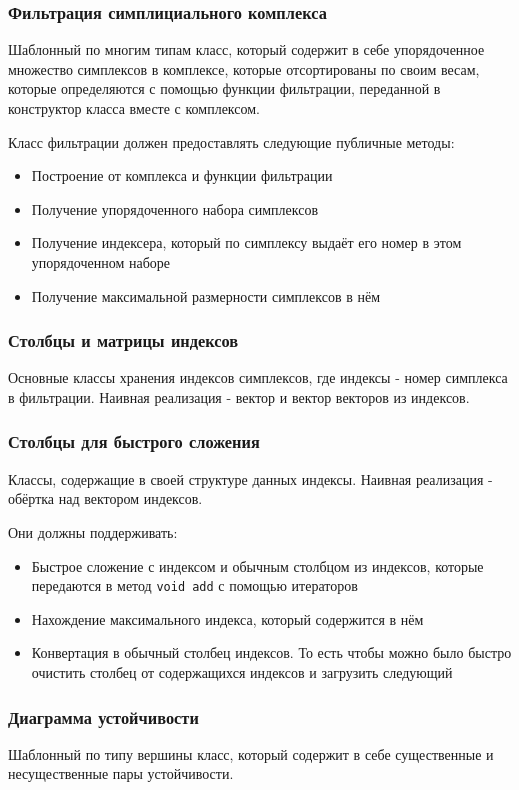 \documentclass{article}
\begin{document}
\subsubsection{Фильтрация симплициального комплекса}
Шаблонный по многим типам класс, который содержит в себе упорядоченное множество симплексов в комплексе, которые отсортированы по своим весам, которые определяются с помощью функции фильтрации, переданной в конструктор класса вместе с комплексом.

Класс фильтрации должен предоставлять следующие публичные методы:
\begin{itemize}
  \item Построение от комплекса и функции фильтрации
  \item Получение упорядоченного набора симплексов
  \item Получение индексера, который по симплексу выдаёт его номер в этом упорядоченном наборе
  \item Получение максимальной размерности симплексов в нём
\end{itemize}
\subsubsection{Столбцы и матрицы индексов}
Основные классы хранения индексов симплексов, где индексы - номер симплекса в фильтрации. Наивная реализация - вектор и вектор векторов из индексов.
\subsubsection{Столбцы для быстрого сложения}
Классы, содержащие в своей структуре данных индексы. Наивная реализация - обёртка над вектором индексов.

Они должны поддерживать:
\begin{itemize}
  \item Быстрое сложение с индексом и обычным столбцом из индексов, которые передаются в метод \verb"void add" с помощью итераторов
  \item Нахождение максимального индекса, который содержится в нём
  \item Конвертация в обычный столбец индексов. То есть чтобы можно было быстро очистить столбец от содержащихся индексов и загрузить следующий
\end{itemize}
\subsubsection{Диаграмма устойчивости}
Шаблонный по типу вершины класс, который содержит в себе существенные и несущественные пары устойчивости.
\end{document}

